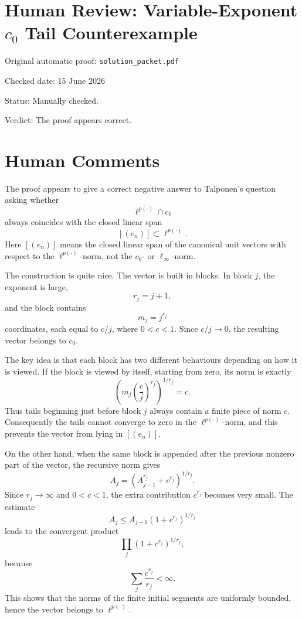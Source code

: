 ﻿\documentclass[11pt]{article}
\begin{document}
\section*{Human Review: Variable-Exponent \texorpdfstring{$c_0$}{c0} Tail Counterexample}

\noindent Original automatic proof: \texttt{solution\_packet.pdf}

\noindent Checked date: 15 June 2026

\noindent Status: Manually checked.

\noindent Verdict: The proof appears correct.

\section*{Human Comments}

The proof appears to give a correct negative answer to Talponen's question asking whether
\[
  \ell^{p(\cdot)}\cap c_0
\]
always coincides with the closed linear span
\[
  [(e_n)]\subset \ell^{p(\cdot)}.
\]
Here \([(e_n)]\) means the closed linear span of the canonical unit vectors with respect to the \(\ell^{p(\cdot)}\)-norm, not the \(c_0\)- or \(\ell_\infty\)-norm.

The construction is quite nice. The vector is built in blocks. In block \(j\), the exponent is large,
\[
  r_j=j+1,
\]
and the block contains
\[
  m_j=j^{r_j}
\]
coordinates, each equal to \(c/j\), where \(0<c<1\). Since \(c/j\to0\), the resulting vector belongs to \(c_0\).

The key idea is that each block has two different behaviours depending on how it is viewed. If the block is viewed by itself, starting from zero, its norm is exactly
\[
  \left(m_j\left(\frac cj\right)^{r_j}\right)^{1/r_j}=c.
\]
Thus tails beginning just before block \(j\) always contain a finite piece of norm \(c\). Consequently the tails cannot converge to zero in the \(\ell^{p(\cdot)}\)-norm, and this prevents the vector from lying in \([(e_n)]\).

On the other hand, when the same block is appended after the previous nonzero part of the vector, the recursive norm gives
\[
  A_j=\left(A_{j-1}^{r_j}+c^{r_j}\right)^{1/r_j}.
\]
Since \(r_j\to\infty\) and \(0<c<1\), the extra contribution \(c^{r_j}\) becomes very small. The estimate
\[
  A_j\leq A_{j-1}(1+c^{r_j})^{1/r_j}
\]
leads to the convergent product
\[
  \prod_j (1+c^{r_j})^{1/r_j},
\]
because
\[
  \sum_j \frac{c^{r_j}}{r_j}<\infty.
\]
This shows that the norms of the finite initial segments are uniformly bounded, hence the vector belongs to \(\ell^{p(\cdot)}\).
\end{document}
